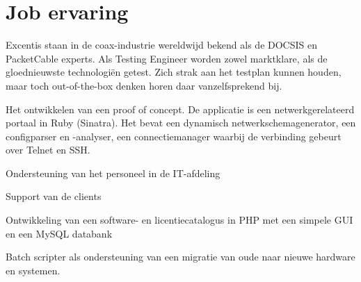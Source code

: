 \documentclass[a4paper]{deedy-resume} %
\begin{document}
\begin{minipage}[t]{0.60\textwidth} %


\section{Job ervaring}


\vspace{\topsep} %
\begin{tightitemize}
\item Excentis staan in de coax-industrie wereldwijd bekend als de DOCSIS en PacketCable experts. Als Testing Engineer worden zowel marktklare, als de gloednieuwste technologiën getest. Zich strak aan het testplan kunnen houden, maar toch out-of-the-box denken horen daar vanzelfsprekend bij.
\end{tightitemize}

\sectionspace %



\vspace{\topsep} %
\begin{tightitemize}
\item Het ontwikkelen van een proof of concept. De applicatie is een netwerkgerelateerd portaal in Ruby (Sinatra). Het bevat een dynamisch netwerkschemagenerator, een configparser en -analyser, een connectiemanager waarbij de verbinding gebeurt over Telnet en SSH.
\end{tightitemize}

\sectionspace %



\begin{tightitemize}
\item Ondersteuning van het personeel in de IT-afdeling
\item Support van de clients
\item Ontwikkeling van een software- en licentiecatalogus in PHP met een simpele GUI en een MySQL databank
\item Batch scripter als ondersteuning van een migratie van oude naar nieuwe hardware en systemen.
\end{tightitemize}


\end{minipage}
\end{document}
